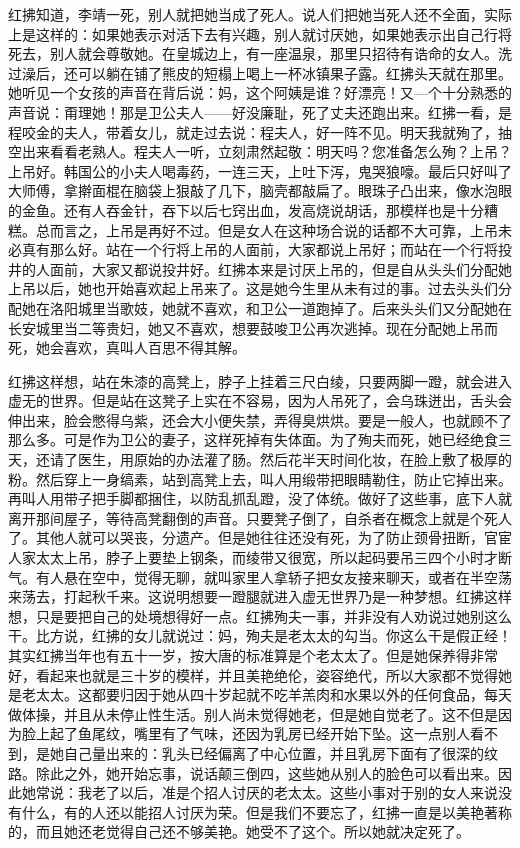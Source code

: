 红拂知道，李靖一死，别人就把她当成了死人。说人们把她当死人还不全面，实际上是这样的：如果她表示对活下去有兴趣，别人就讨厌她，如果她表示出自己行将死去，别人就会尊敬她。在皇城边上，有一座温泉，那里只招待有诰命的女人。洗过澡后，还可以躺在铺了熊皮的短榻上喝上一杯冰镇果子露。红拂头天就在那里。她听见一个女孩的声音在背后说：妈，这个阿姨是谁？好漂亮！又—个十分熟悉的声音说：甭理她！那是卫公夫人——好没廉耻，死了丈夫还跑出来。红拂一看，是程咬金的夫人，带着女儿，就走过去说：程夫人，好一阵不见。明天我就殉了，抽空出来看看老熟人。程夫人一听，立刻肃然起敬：明天吗？您准备怎么殉？上吊？上吊好。韩国公的小夫人喝毒药，一连三天，上吐下泻，鬼哭狼嚎。最后只好叫了大师傅，拿擀面棍在脑袋上狠敲了几下，脑壳都敲扁了。眼珠子凸出来，像水泡眼的金鱼。还有人吞金针，吞下以后七窍出血，发高烧说胡话，那模样也是十分糟糕。总而言之，上吊是再好不过。但是女人在这种场合说的话都不大可靠，上吊未必真有那么好。站在一个行将上吊的人面前，大家都说上吊好；而站在一个行将投井的人面前，大家又都说投井好。红拂本来是讨厌上吊的，但是自从头头们分配她上吊以后，她也开始喜欢起上吊来了。这是她今生里从未有过的事。过去头头们分配她在洛阳城里当歌妓，她就不喜欢，和卫公一道跑掉了。后来头头们又分配她在长安城里当二等贵妇，她又不喜欢，想要鼓唆卫公再次逃掉。现在分配她上吊而死，她会喜欢，真叫人百思不得其解。 

红拂这样想，站在朱漆的高凳上，脖子上挂着三尺白绫，只要两脚一蹬，就会进入虚无的世界。但是站在这凳子上实在不容易，因为人吊死了，会乌珠迸出，舌头会伸出来，脸会憋得乌紫，还会大小便失禁，弄得臭烘烘。要是一般人，也就顾不了那么多。可是作为卫公的妻子，这样死掉有失体面。为了殉夫而死，她已经绝食三天，还请了医生，用原始的办法灌了肠。然后花半天时间化妆，在脸上敷了极厚的粉。然后穿上一身缟素，站到高凳上去，叫人用缎带把眼睛勒住，防止它掉出来。再叫人用带子把手脚都捆住，以防乱抓乱蹬，没了体统。做好了这些事，底下人就离开那间屋子，等待高凳翻倒的声音。只要凳子倒了，自杀者在概念上就是个死人了。其他人就可以哭丧，分遗产。但是她往往还没有死，为了防止颈骨扭断，官宦人家太太上吊，脖子上要垫上钢条，而绫带又很宽，所以起码要吊三四个小时才断气。有人悬在空中，觉得无聊，就叫家里人拿轿子把女友接来聊天，或者在半空荡来荡去，打起秋千来。这说明想要一蹬腿就进入虚无世界乃是一种梦想。红拂这样想，只是要把自己的处境想得好一点。红拂殉夫一事，并非没有人劝说过她别这么干。比方说，红拂的女儿就说过：妈，殉夫是老太太的勾当。你这么干是假正经！其实红拂当年也有五十一岁，按大唐的标准算是个老太太了。但是她保养得非常好，看起来也就是三十岁的模样，并且美艳绝伦，姿容绝代，所以大家都不觉得她是老太太。这都要归因于她从四十岁起就不吃羊羔肉和水果以外的任何食品，每天做体操，并且从未停止性生活。别人尚未觉得她老，但是她自觉老了。这不但是因为脸上起了鱼尾纹，嘴里有了气味，还因为乳房已经开始下坠。这一点别人看不到，是她自己量出来的：乳头已经偏离了中心位置，并且乳房下面有了很深的纹路。除此之外，她开始忘事，说话颠三倒四，这些她从别人的脸色可以看出来。因此她常说：我老了以后，准是个招人讨厌的老太太。这些小事对于别的女人来说没有什么，有的人还以能招人讨厌为荣。但是我们不要忘了，红拂一直是以美艳著称的，而且她还老觉得自己还不够美艳。她受不了这个。所以她就决定死了。 

